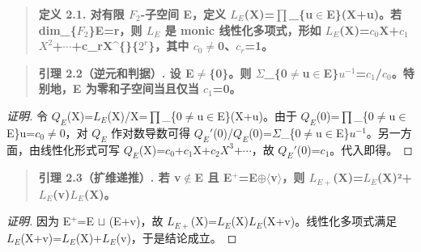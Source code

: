 \documentclass[11pt]{ctexart}
\begin{document}
\begin{quote}\textbf{定义 2.1. 对有限 \ensuremath{F_2}-子空间 E，定义 \ensuremath{L_{E}}(X)=\ensuremath{\prod}\_\{u\ensuremath{\in}E\}(X+u)。若 dim\_\{\ensuremath{F_2}\}E=r，则 \ensuremath{L_{E}} 是 monic 线性化多项式，形如 \ensuremath{L_{E}}(X)=\ensuremath{c_0}X+\ensuremath{c_1}\ensuremath{X^2}+\ensuremath{\cdots}+c\_rX\textasciicircum\{\}\{\ensuremath{2^{r}}\}，其中 \ensuremath{c_0}\ensuremath{\ne}0、\ensuremath{c_{r}}=1。}\end{quote}

\begin{quote}\textbf{引理 2.2（逆元和判据）. 设 E\ensuremath{\ne}\{0\}。则 \ensuremath{\Sigma}\_\{0\ensuremath{\ne}u\ensuremath{\in}E\}\ensuremath{u^{-1}}=\ensuremath{c_1}/\ensuremath{c_0}。特别地，E 为零和子空间当且仅当 \ensuremath{c_1}=0。}\end{quote}

\begin{proof}[证明] 

令 \ensuremath{Q_{E}}(X)=\ensuremath{L_{E}}(X)/X=\ensuremath{\prod}\_\{0\ensuremath{\ne}u\ensuremath{\in}E\}(X+u)。由于 \ensuremath{Q_{E}}(0)=\ensuremath{\prod}\_\{0\ensuremath{\ne}u\ensuremath{\in}E\}u=\ensuremath{c_0}\ensuremath{\ne}0，对 \ensuremath{Q_{E}} 作对数导数可得 \ensuremath{Q_{E}}\ensuremath{\prime}(0)/\ensuremath{Q_{E}}(0)=\ensuremath{\Sigma}\_\{0\ensuremath{\ne}u\ensuremath{\in}E\}\ensuremath{u^{-1}}。另一方面，由线性化形式可写 \ensuremath{Q_{E}}(X)=\ensuremath{c_0}+\ensuremath{c_1}X+\ensuremath{c_2}\ensuremath{X^3}+\ensuremath{\cdots}，故 \ensuremath{Q_{E}}\ensuremath{\prime}(0)=\ensuremath{c_1}。代入即得。

\end{proof}

\begin{quote}\textbf{引理 2.3（扩维递推）. 若 v\ensuremath{\notin}E 且 E\ensuremath{^+}=E\ensuremath{\oplus}\ensuremath{\langle}v\ensuremath{\rangle}，则 \ensuremath{L_{E+}}(X)=\ensuremath{L_{E}}(X)²+\ensuremath{L_{E}}(v)\ensuremath{L_{E}}(X)。}\end{quote}

\begin{proof}[证明] 

因为 E\ensuremath{^+}=E \ensuremath{\sqcup} (E+v)，故 \ensuremath{L_{E+}}(X)=\ensuremath{L_{E}}(X)\ensuremath{L_{E}}(X+v)。线性化多项式满足 \ensuremath{L_{E}}(X+v)=\ensuremath{L_{E}}(X)+\ensuremath{L_{E}}(v)，于是结论成立。

\end{proof}
\end{document}
